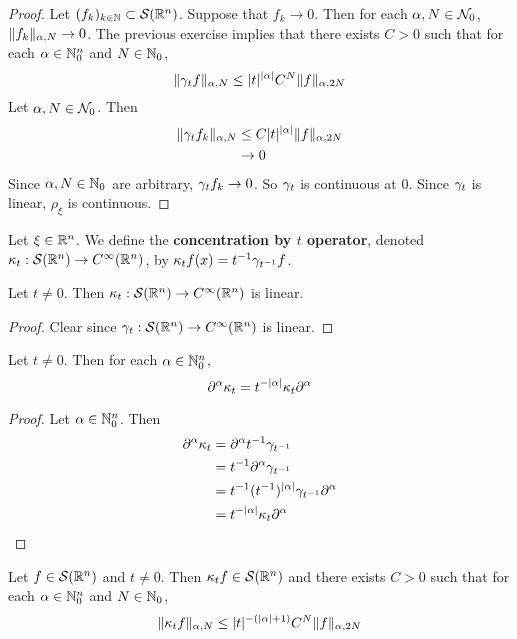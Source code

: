\documentclass{book}
\begin{document}
	\begin{proof} 
		Let $(f_k)_{k \in \mathbb{N}} \subset \mathcal{S}(\mathbb{R}^n)$. Suppose that $f_k \rightarrow 0$. Then for each $\alpha,N \in \mathcal{N}_0$, $\|f_k\|_{\alpha, N} \rightarrow 0$. The previous exercise implies that  there exists $C > 0$ such that for each $\alpha \in \mathbb{N}_0^n$ and $N \in \mathbb{N}_0$, 
		$$\| \gamma_t f\|_{\alpha, N} \leq |t|^{|\alpha|} C^N\|f\|_{\alpha, 2N}$$ 
		Let $\alpha,N \in \mathcal{N}_0$. Then 
		\begin{align*}
			\|\gamma_tf_k\|_{\alpha, N} 
			& \leq C |t|^{|\alpha|} \|f\|_{\alpha, 2N} \\
			& \rightarrow 0
		\end{align*}
		Since $\alpha, N \in \mathbb{N}_0$ are arbitrary, $\gamma_t f_k \rightarrow 0$. So $\gamma_t$  is continuous at $0$. Since $\gamma_t$ is linear, $\rho_{\xi}$ is continuous.
	\end{proof}

	\begin{defn}
		Let $\xi \in \mathbb{R}^n$. We define the \textbf{concentration by $t$ operator}, denoted $\kappa_t: \mathcal{S}(\mathbb{R}^n) \rightarrow C^{\infty}(\mathbb{R}^n)$, by $\kappa_t f(x) = t^{-1} \gamma_{t^{-1}} f$.
	\end{defn}

	\begin{ex}
		Let $t \neq 0$. Then $\kappa_t: \mathcal{S}(\mathbb{R}^n) \rightarrow C^{\infty}(\mathbb{R}^n)$ is linear.
	\end{ex}
	
	\begin{proof}
		Clear since $\gamma_t: \mathcal{S}(\mathbb{R}^n) \rightarrow C^{\infty}(\mathbb{R}^n)$ is linear.
	\end{proof}
	
	\begin{ex}
		Let $t \neq 0$. Then for each $\alpha \in \mathbb{N}_0^n$,  
		$$\partial^{\alpha} \kappa_t = t^{-|\alpha|} \kappa_t \partial^{\alpha} $$
	\end{ex}
	
	\begin{proof}
		Let $\alpha \in \mathbb{N}_0^n$. Then 
		\begin{align*}
			\partial^{\alpha} \kappa_t 
			& = \partial^{\alpha} t^{-1} \gamma_{t^{-1}} \\
			& = t^{-1} \partial^{\alpha} \gamma_{t^{-1}} \\
			& = t^{-1} (t^{-1})^{|\alpha|} \gamma_{t^{-1}} \partial^{\alpha} \\
			& = t^{-|\alpha|} \kappa_{t} \partial^{\alpha}
		\end{align*}
	\end{proof}
	
	\begin{ex}
		Let $f \in \mathcal{S}(\mathbb{R}^n)$ and $t \neq 0$. Then $ \kappa_t f \in \mathcal{S}(\mathbb{R}^n)$ and there exists $C > 0$ such that for each $\alpha \in \mathbb{N}_0^n$ and $N \in \mathbb{N}_0$, 
		$$\| \kappa_t f\|_{\alpha, N} \leq |t|^{-(|\alpha|+1)} C^N\|f\|_{\alpha, 2N}$$
	\end{ex}
	
\end{document}

